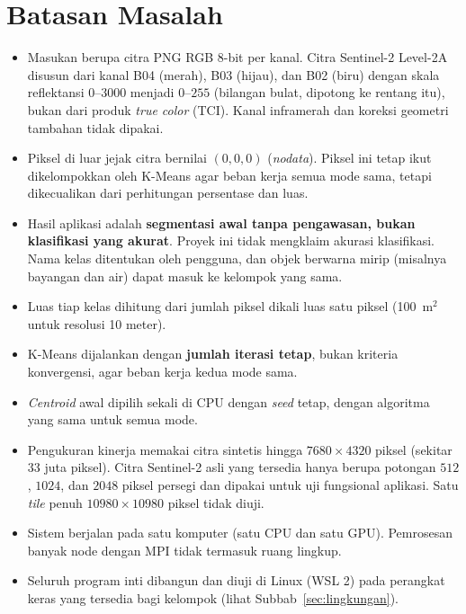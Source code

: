 \section{Batasan Masalah}
\label{sec:batasanmasalah}
\begin{itemize}
    \item Masukan berupa citra PNG RGB 8-bit per kanal. Citra Sentinel-2 Level-2A disusun dari kanal B04 (merah), B03 (hijau), dan B02 (biru) dengan skala reflektansi $0$--$3000$ menjadi $0$--$255$ (bilangan bulat, dipotong ke rentang itu), bukan dari produk \emph{true color} (TCI). Kanal inframerah dan koreksi geometri tambahan tidak dipakai.
    \item Piksel di luar jejak citra bernilai $(0,0,0)$ (\emph{nodata}). Piksel ini tetap ikut dikelompokkan oleh K-Means agar beban kerja semua mode sama, tetapi dikecualikan dari perhitungan persentase dan luas.
    \item Hasil aplikasi adalah \textbf{segmentasi awal tanpa pengawasan, bukan klasifikasi yang akurat}. Proyek ini tidak mengklaim akurasi klasifikasi. Nama kelas ditentukan oleh pengguna, dan objek berwarna mirip (misalnya bayangan dan air) dapat masuk ke kelompok yang sama.
    \item Luas tiap kelas dihitung dari jumlah piksel dikali luas satu piksel (100~m$^2$ untuk resolusi 10 meter).
    \item K-Means dijalankan dengan \textbf{jumlah iterasi tetap}, bukan kriteria konvergensi, agar beban kerja kedua mode sama.
    \item \emph{Centroid} awal dipilih sekali di CPU dengan \emph{seed} tetap, dengan algoritma yang sama untuk semua mode.
    \item Pengukuran kinerja memakai citra sintetis hingga $7680\times4320$ piksel (sekitar 33 juta piksel). Citra Sentinel-2 asli yang tersedia hanya berupa potongan $512$, $1024$, dan $2048$ piksel persegi dan dipakai untuk uji fungsional aplikasi. Satu \emph{tile} penuh $10980\times10980$ piksel tidak diuji.
    \item Sistem berjalan pada satu komputer (satu CPU dan satu GPU). Pemrosesan banyak node dengan MPI tidak termasuk ruang lingkup.
    \item Seluruh program inti dibangun dan diuji di Linux (WSL 2) pada perangkat keras yang tersedia bagi kelompok (lihat Subbab~\ref{sec:lingkungan}).
\end{itemize}
